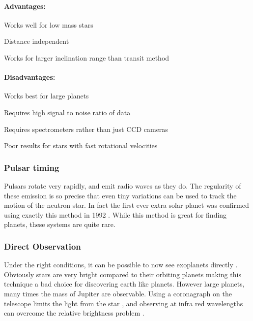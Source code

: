 \paragraph{Advantages:}
\begin{itemize*}
    \item Works well for low mass stars
    \item Distance independent
    \item Works for larger inclination range than transit method
\end{itemize*}

\paragraph{Disadvantages:}
\begin{itemize*}
    \item Works best for large planets
    \item Requires high signal to noise ratio of data
    \item Requires spectrometers rather than just CCD cameras
    \item Poor results for stars with fast rotational velocities
\end{itemize*}

\subsubsection{Pulsar timing}

Pulsars rotate very rapidly, and emit radio waves as they do. The regularity of these emission is so precise that even tiny variations can be used to track the motion of the neutron star. In fact the first ever extra solar planet was confirmed using exactly this method in 1992 \citep{wolszczan1992planetary}. While this method is great for finding planets, these systems are quite rare.

\subsubsection{Direct Observation}

Under the right conditions, it can be possible to now see exoplanets directly \citep{lafreniere2010directly,kuzuhara2013direct,delorme2013direct}. Obviously stars are very bright compared to their orbiting planets making this technique a bad choice for discovering earth like planets. However large planets, many times the mass of Jupiter are observable. Using a coronagraph on the telescope limits the light from the star \citep{kuchner2002coronagraph}, and observing at infra red wavelengths can overcome the relative brightness problem \citep{delorme2013direct}.
